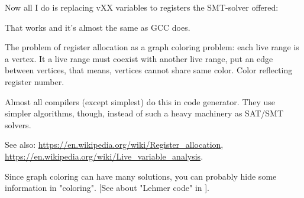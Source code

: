 Now all I do is replacing vXX variables to registers the SMT-solver offered:



That works and it's almost the same as GCC does.

The problem of register allocation as a graph coloring problem: each live range is a vertex.
It a live range must coexist with another live range, put an edge between vertices, that means, vertices cannot share same color.
Color reflecting register number.

Almost all compilers (except simplest) do this in code generator. They use simpler algorithms, though, instead of such a heavy machinery as SAT/SMT solvers.

See also: \url{https://en.wikipedia.org/wiki/Register_allocation}, \url{https://en.wikipedia.org/wiki/Live_variable_analysis}.

Since graph coloring can have many solutions, you can probably hide some information
in "coloring".
[See about "Lehmer code" in \MathForProg{}].


